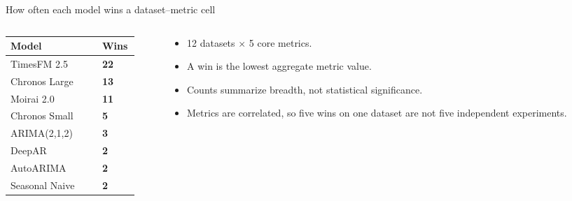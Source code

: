 \begin{frame}{How often each model wins a dataset--metric cell}
  \vspace{0.08cm}
  \begin{columns}[T,totalwidth=0.94\linewidth]
    \begin{column}{0.48\linewidth}
      \small
      \renewcommand{\arraystretch}{1.30}
      \setlength{\tabcolsep}{5pt}
      \begin{tabular}{L{0.66\linewidth} C{0.20\linewidth}}
        \toprule
        \textbf{Model} & \textbf{Wins} \\
        \midrule
        TimesFM 2.5 & \textbf{22} \\
        Chronos Large & \textbf{13} \\
        Moirai 2.0 & \textbf{11} \\
        Chronos Small & \textbf{5} \\
        ARIMA(2,1,2) & \textbf{3} \\
        DeepAR & \textbf{2} \\
        AutoARIMA & \textbf{2} \\
        Seasonal Naive & \textbf{2} \\
        \bottomrule
      \end{tabular}
    \end{column}
    \begin{column}{0.40\linewidth}
      \small
      \vspace{0.22cm}
      \begin{itemize}
        \item 12 datasets $\times$ 5 core metrics.
        \item A win is the lowest aggregate metric value.
        \item Counts summarize breadth, not statistical significance.
        \item Metrics are correlated, so five wins on one dataset are not five independent experiments.
      \end{itemize}
    \end{column}
  \end{columns}
\end{frame}
